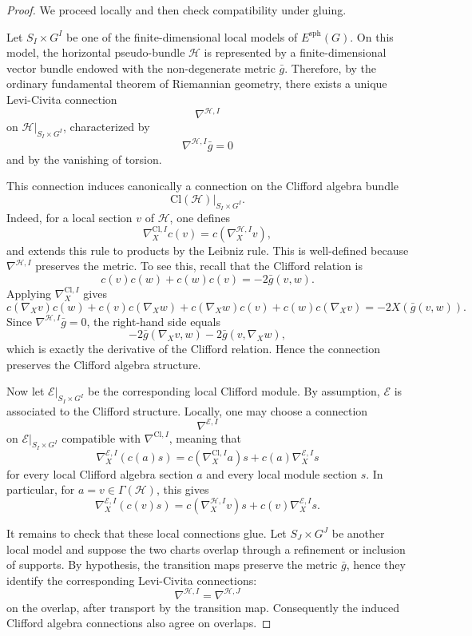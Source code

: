 \documentclass[10pt,a4paper]{amsart}
\begin{document}
\begin{proof}
We proceed locally and then check compatibility under gluing.

Let \(S_I\times G^I\) be one of the finite-dimensional local models of
\(E^{\mathrm{sph}}(G)\). On this model, the horizontal pseudo-bundle
\(\mathcal H\) is represented by a finite-dimensional vector bundle endowed
with the non-degenerate metric \(\bar g\). Therefore, by the ordinary
fundamental theorem of Riemannian geometry, there exists a unique
Levi-Civita connection
\[
\nabla^{\mathcal H,I}
\]
on \(\mathcal H|_{S_I\times G^I}\), characterized by
\[
\nabla^{\mathcal H,I}\bar g=0
\]
and by the vanishing of torsion.

This connection induces canonically a connection on the Clifford algebra
bundle
\[
\mathrm{Cl}(\mathcal H)|_{S_I\times G^I}.
\]
Indeed, for a local section \(v\) of \(\mathcal H\), one defines
\[
\nabla^{\mathrm{Cl},I}_X c(v)
=
c(\nabla^{\mathcal H,I}_X v),
\]
and extends this rule to products by the Leibniz rule. This is well-defined
because \(\nabla^{\mathcal H,I}\) preserves the metric. To see this, recall
that the Clifford relation is
\[
c(v)c(w)+c(w)c(v)=-2\bar g(v,w).
\]
Applying \(\nabla^{\mathrm{Cl},I}_X\) gives
\[
c(\nabla_X v)c(w)+c(v)c(\nabla_X w)
+
c(\nabla_X w)c(v)+c(w)c(\nabla_X v)
=
-2X(\bar g(v,w)).
\]
Since \(\nabla^{\mathcal H,I}\bar g=0\), the right-hand side equals
\[
-2\bar g(\nabla_X v,w)-2\bar g(v,\nabla_X w),
\]
which is exactly the derivative of the Clifford relation. Hence the
connection preserves the Clifford algebra structure.

Now let \(\mathcal E|_{S_I\times G^I}\) be the corresponding local
Clifford module. By assumption, \(\mathcal E\) is associated to the
Clifford structure. Locally, one may choose a connection
\[
\nabla^{\mathcal E,I}
\]
on \(\mathcal E|_{S_I\times G^I}\) compatible with
\(\nabla^{\mathrm{Cl},I}\), meaning that
\[
\nabla^{\mathcal E,I}_X(c(a)s)
=
c(\nabla^{\mathrm{Cl},I}_X a)s
+
c(a)\nabla^{\mathcal E,I}_X s
\]
for every local Clifford algebra section \(a\) and every local module
section \(s\). In particular, for \(a=v\in\Gamma(\mathcal H)\), this gives
\[
\nabla^{\mathcal E,I}_X(c(v)s)
=
c(\nabla^{\mathcal H,I}_X v)s
+
c(v)\nabla^{\mathcal E,I}_X s.
\]

It remains to check that these local connections glue. Let
\(S_J\times G^J\) be another local model and suppose the two charts overlap
through a refinement or inclusion of supports. By hypothesis, the transition
maps preserve the metric \(\bar g\), hence they identify the corresponding
Levi-Civita connections:
\[
\nabla^{\mathcal H,I}
=
\nabla^{\mathcal H,J}
\]
on the overlap, after transport by the transition map. Consequently the
induced Clifford algebra connections also agree on overlaps.


\end{proof}
\end{document}
